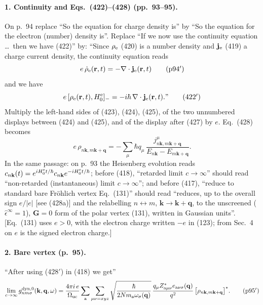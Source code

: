 \paragraph{1. Continuity and Eqs.~(422)--(428) (pp.~93--95).}
On p.~94 replace ``So the equation for charge density is'' by ``So the equation for the electron
(number) density is''. Replace ``If we now use the continuity equation \ldots\ then we have (422)'' by: ``Since $\rho_{\rm e}$
(420) is a number density and $\mathbf j_{\rm e}$ (419) a charge current density, the continuity
equation reads
\begin{equation*}
e\,\dot\rho_{\rm e}(\mathbf r,t)=-\nabla\cdot\mathbf j_{\rm e}(\mathbf r,t)
\tag{p94$'$}
\end{equation*}
and we have
\begin{equation*}
e\,[\rho_{\rm e}(\mathbf r,t),H^{\rm e}_0]_-=-i\hbar\,\nabla\cdot\mathbf j_{\rm e}(\mathbf r,t).\text{''}
\tag{422$'$}
\end{equation*}
Multiply the left-hand sides of (423), (424), (425), of the two unnumbered displays between (424) and
(425), and of the display after (427) by $e$. Eq.~(428) becomes
\begin{equation*}
e\,\rho_{n\mathbf k,m\mathbf k+\mathbf q}=-\sum_\mu\hbar q_\mu\,
\frac{j^\mu_{n\mathbf k,m\mathbf k+\mathbf q}}{E_{n\mathbf k}-E_{m\mathbf k+\mathbf q}} .
\tag{428$'$}
\end{equation*}
In the same passage: on p.~93 the Heisenberg evolution reads
$c_{n\mathbf k}(t)=e^{iH^{\rm e}_0t/\hbar}c_{n\mathbf k}e^{-iH^{\rm e}_0t/\hbar}$; before (418),
``retarded limit $c\to\infty$'' should read ``non-retarded (instantaneous) limit $c\to\infty$''; and
before (417), ``reduce to standard bare Fr\"ohlich vertex Eq.~(131)'' should read ``reduces, up to
the overall sign $e/|e|$ [see (428a)] and the relabelling $n\leftrightarrow m$,
$\mathbf k\to\mathbf k+\mathbf q$, to the unscreened ($\hat\epsilon^\infty=1$), $\mathbf G=0$ form of
the polar vertex (131), written in Gaussian units''. [Eq.~(131) uses $e>0$, with the electron charge
written $-e$ in (123); from Sec.~4 on $e$ is the signed electron charge.]

\paragraph{2. Bare vertex (p.~95).}
``After using (428$'$) in (418) we get''
\begin{equation*}
\lim_{c\to\infty}g^{\rm dyn,0}_{nm\sigma}(\mathbf k,\mathbf q,\omega)=
\frac{4\pi i\,e}{\Omega_{\rm uc}}\sum_{\rm a}\sum_{\mu\nu=xyz}
\sqrt{\frac{\hbar}{2Nm_{\rm a}\omega_\sigma(\mathbf q)}}\,
\frac{q_\mu Z^*_{{\rm a}\mu\nu}e_{{\rm a}\nu\sigma}(\mathbf q)}{q^2}\,
\big[\rho_{n\mathbf k,m\mathbf k+\mathbf q}\big]^* .
\tag{p95$'$}
\end{equation*}

